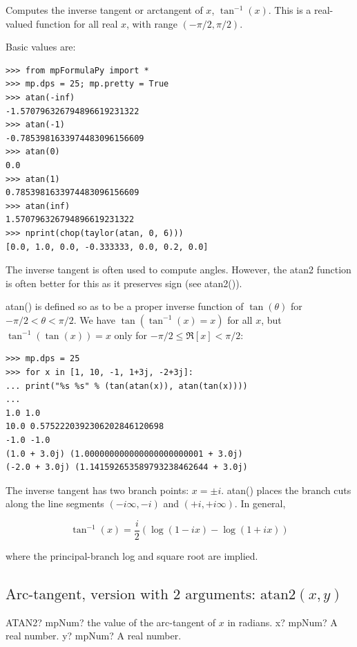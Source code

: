 Computes the inverse tangent or arctangent of $x$, $\tan^{-1}(x)$. This is a real-valued function for all real $x$, with range $(-\pi/2, \pi/2)$.

\vpara
Basic values are:
\begin{lstlisting}
>>> from mpFormulaPy import *
>>> mp.dps = 25; mp.pretty = True
>>> atan(-inf)
-1.570796326794896619231322
>>> atan(-1)
-0.7853981633974483096156609
>>> atan(0)
0.0
>>> atan(1)
0.7853981633974483096156609
>>> atan(inf)
1.570796326794896619231322
>>> nprint(chop(taylor(atan, 0, 6)))
[0.0, 1.0, 0.0, -0.333333, 0.0, 0.2, 0.0]
\end{lstlisting}

The inverse tangent is often used to compute angles. However, the atan2 function is often better for this as it preserves sign (see atan2()).

\vpara
atan() is defined so as to be a proper inverse function of $\tan(\theta)$ for $-\pi/2 < \theta < \pi/2$. We have $\tan(\tan^{-1}(x)=x)$ for all $x$, but $\tan^{-1}(\tan(x))=x$ only for $-\pi/2 \le \Re[x]<\pi/2$:

\begin{lstlisting}
>>> mp.dps = 25
>>> for x in [1, 10, -1, 1+3j, -2+3j]:
... print("%s %s" % (tan(atan(x)), atan(tan(x))))
...
1.0 1.0
10.0 0.5752220392306202846120698
-1.0 -1.0
(1.0 + 3.0j) (1.000000000000000000000001 + 3.0j)
(-2.0 + 3.0j) (1.141592653589793238462644 + 3.0j)
\end{lstlisting}

The inverse tangent has two branch points: $x=\pm i$. atan() places the branch cuts along the line segments $(-i\infty,-i)$ and $(+i, +i\infty)$. In general, 

\begin{equation}
	\tan^{-1}(x) =  \frac{i}{2} \left(\log (1-ix) - \log (1+ix)\right)
\end{equation}

where the principal-branch log and square root are implied.


\newpage
\subsection{\texorpdfstring{$\text{Arc-tangent, version with 2 arguments: atan2}(x,y)$}{atan2}}


\begin{mpFunctionsExtract}
	\mpWorksheetFunctionTwoNotImplemented
	{ATAN2? mpNum? the value of the arc-tangent of $x$ in radians.}
	{x? mpNum? A real number.}
	{y? mpNum? A real number.}
\end{mpFunctionsExtract}

